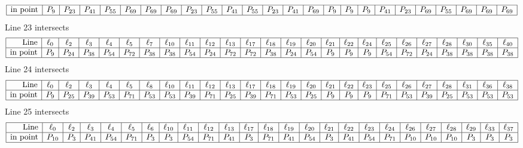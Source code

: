 \documentclass{article}
\begin{document}
{$$\begin{array}{|r*{24}{|c}|}
\hline
\mbox{in point}  & P_{9} & P_{23} & P_{41} & P_{55} & P_{69} & P_{69} & P_{69} & P_{23} & P_{55} & P_{41} & P_{55} & P_{23} & P_{41} & P_{69} & P_{9} & P_{9} & P_{9} & P_{41} & P_{23} & P_{69} & P_{55} & P_{69} & P_{69} & P_{69}\\
\hline
\end{array}
$$
Line 23 intersects 
$$
\begin{array}{|r*{24}{|c}|}
\hline
\mbox{Line}  & \ell_{0} & \ell_{2} & \ell_{3} & \ell_{4} & \ell_{5} & \ell_{7} & \ell_{10} & \ell_{11} & \ell_{12} & \ell_{13} & \ell_{17} & \ell_{18} & \ell_{19} & \ell_{20} & \ell_{21} & \ell_{22} & \ell_{24} & \ell_{25} & \ell_{26} & \ell_{27} & \ell_{28} & \ell_{30} & \ell_{35} & \ell_{40}\\
\hline
\mbox{in point}  & P_{9} & P_{24} & P_{38} & P_{54} & P_{72} & P_{38} & P_{38} & P_{54} & P_{24} & P_{72} & P_{72} & P_{38} & P_{24} & P_{54} & P_{9} & P_{9} & P_{9} & P_{54} & P_{72} & P_{24} & P_{38} & P_{38} & P_{38} & P_{38}\\
\hline
\end{array}
$$
Line 24 intersects 
$$
\begin{array}{|r*{24}{|c}|}
\hline
\mbox{Line}  & \ell_{0} & \ell_{2} & \ell_{3} & \ell_{4} & \ell_{5} & \ell_{8} & \ell_{10} & \ell_{11} & \ell_{12} & \ell_{13} & \ell_{17} & \ell_{18} & \ell_{19} & \ell_{20} & \ell_{21} & \ell_{22} & \ell_{23} & \ell_{25} & \ell_{26} & \ell_{27} & \ell_{28} & \ell_{31} & \ell_{36} & \ell_{38}\\
\hline
\mbox{in point}  & P_{9} & P_{25} & P_{39} & P_{53} & P_{71} & P_{53} & P_{53} & P_{39} & P_{71} & P_{25} & P_{39} & P_{71} & P_{53} & P_{25} & P_{9} & P_{9} & P_{9} & P_{71} & P_{53} & P_{39} & P_{25} & P_{53} & P_{53} & P_{53}\\
\hline
\end{array}
$$
Line 25 intersects 
$$
\begin{array}{|r*{24}{|c}|}
\hline
\mbox{Line}  & \ell_{0} & \ell_{2} & \ell_{3} & \ell_{4} & \ell_{5} & \ell_{6} & \ell_{10} & \ell_{11} & \ell_{12} & \ell_{13} & \ell_{17} & \ell_{18} & \ell_{19} & \ell_{20} & \ell_{21} & \ell_{22} & \ell_{23} & \ell_{24} & \ell_{26} & \ell_{27} & \ell_{28} & \ell_{29} & \ell_{33} & \ell_{37}\\
\hline
\mbox{in point}  & P_{10} & P_{3} & P_{41} & P_{54} & P_{71} & P_{3} & P_{3} & P_{54} & P_{71} & P_{41} & P_{3} & P_{71} & P_{41} & P_{54} & P_{3} & P_{41} & P_{54} & P_{71} & P_{10} & P_{10} & P_{10} & P_{3} & P_{3} & P_{3}\\
\hline

\end{array}$$}
\end{document}
